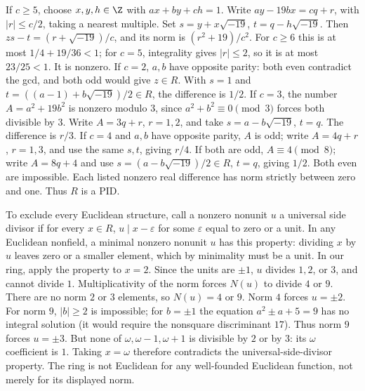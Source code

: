 If $c\ge5$, choose $x,y,h\in\Z$ with $ax+by+ch=1$.
Write $ay-19bx=cq+r$, with $|r|\le c/2$, taking a nearest multiple.
Set $s=y+x\sqrt{-19}$, $t=q-h\sqrt{-19}$. Then
$zs-t=(r+\sqrt{-19})/c$, and its norm is $(r^2+19)/c^2$.
For $c\ge6$ this is at most $1/4+19/36<1$; for $c=5$,
integrality gives $|r|\le2$, so it is at most $23/25<1$.
It is nonzero.
If $c=2$, $a,b$ have opposite parity: both even contradict the gcd,
and both odd would give $z\in R$. With $s=1$ and
$t=((a-1)+b\sqrt{-19})/2\in R$, the difference is $1/2$.
If $c=3$, the number $A=a^2+19b^2$ is nonzero modulo $3$,
since $a^2+b^2\equiv0\pmod3$ forces both divisible by $3$.
Write $A=3q+r$, $r=1,2$, and take
$s=a-b\sqrt{-19}$, $t=q$. The difference is $r/3$.
If $c=4$ and $a,b$ have opposite parity, $A$ is odd; write
$A=4q+r$, $r=1,3$, and use the same $s,t$, giving $r/4$.
If both are odd, $A\equiv4\pmod8$; write $A=8q+4$ and use
$s=(a-b\sqrt{-19})/2\in R$, $t=q$, giving $1/2$.
Both even are impossible. Each listed nonzero real difference has norm
strictly between zero and one. Thus $R$ is a PID.

To exclude every Euclidean structure, call a nonzero nonunit $u$ a
universal side divisor if for every $x\in R$, $u\mid x-\varepsilon$
for some $\varepsilon$ equal to zero or a unit.
In any Euclidean nonfield, a minimal nonzero nonunit $u$ has this
property: dividing $x$ by $u$ leaves zero or a smaller element, which
by minimality must be a unit.
In our ring, apply the property to $x=2$. Since the units are $\pm1$,
$u$ divides $1,2$, or $3$, and cannot divide $1$. Multiplicativity of
the norm forces $N(u)$ to divide $4$ or $9$.
There are no norm $2$ or $3$ elements, so $N(u)=4$ or $9$.
Norm $4$ forces $u=\pm2$. For norm $9$, $|b|\ge2$ is impossible;
for $b=\pm1$ the equation $a^2\pm a+5=9$ has no integral solution
(it would require the nonsquare discriminant $17$).
Thus norm $9$ forces $u=\pm3$.
But none of $\omega,\omega-1,\omega+1$ is divisible by $2$ or by $3$:
its $\omega$ coefficient is $1$. Taking $x=\omega$ therefore
contradicts the universal-side-divisor property.
The ring is not Euclidean for any well-founded Euclidean function,
not merely for its displayed norm.
